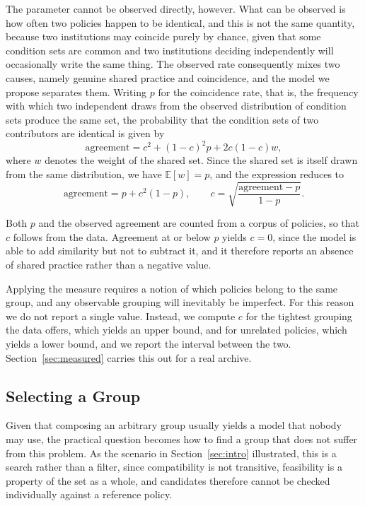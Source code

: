 \documentclass[sigconf,anonymous,review]{acmart}
\begin{document}
The parameter cannot be observed directly, however. What can be observed is how
often two policies happen to be identical, and this is not the same quantity,
because two institutions may coincide purely by chance, given that some condition
sets are common and two institutions deciding independently will occasionally
write the same thing. The observed rate consequently mixes two causes, namely
genuine shared practice and coincidence, and the model we propose separates them.
Writing $p$ for the coincidence rate, that is, the frequency with which two
independent draws from the observed distribution of condition sets produce the
same set, the probability that the condition sets of two contributors are
identical is given by
\[
\mathrm{agreement} = c^2 + (1-c)^2 p + 2c(1-c)w,
\]
where $w$ denotes the weight of the shared set. Since the shared set is itself
drawn from the same distribution, we have $\mathbb{E}[w]=p$, and the expression
reduces to
\[
\mathrm{agreement} = p + c^2 (1-p),
\qquad
c = \sqrt{\frac{\mathrm{agreement}-p}{1-p}}.
\]

Both $p$ and the observed agreement are counted from a corpus of policies, so
that $c$ follows from the data. Agreement at or below $p$ yields $c=0$, since the
model is able to add similarity but not to subtract it, and it therefore reports
an absence of shared practice rather than a negative value.

Applying the measure requires a notion of which policies belong to the same
group, and any observable grouping will inevitably be imperfect. For this reason
we do not report a single value. Instead, we compute $c$ for the tightest
grouping the data offers, which yields an upper bound, and for unrelated
policies, which yields a lower bound, and we report the interval between the two.
Section~\ref{sec:measured} carries this out for a real archive.

\subsection{Selecting a Group}
\label{sec:selection}

Given that composing an arbitrary group usually yields a model that nobody may
use, the practical question becomes how to find a group that does not suffer from
this problem. As the scenario in Section~\ref{sec:intro} illustrated, this is a
search rather than a filter, since compatibility is not transitive, feasibility is
a property of the set as a whole, and candidates therefore cannot be checked
individually against a reference policy.
\end{document}
